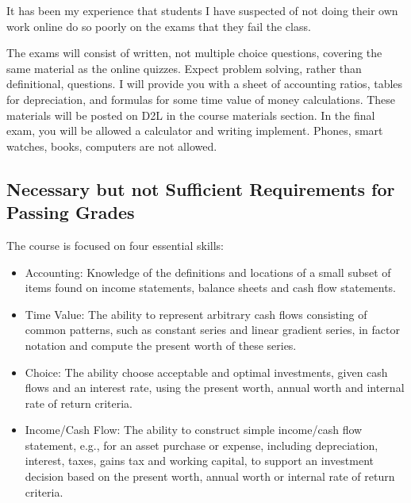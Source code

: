 \documentclass[letterpaper,10pt]{article}
\newif\ifonline
\begin{document}
It has been my experience that students I have suspected of not doing their own work online do so poorly on the exams that they fail the class.

The exams will consist of written, not multiple choice questions, covering the same material as the online quizzes.  Expect problem solving, rather than definitional, questions. I will provide you with a sheet of accounting ratios, tables for depreciation, and formulas for some time value of money calculations.  These materials will be posted on D2L in the course materials section.  In the final exam, you will be allowed a calculator and writing implement.  Phones, smart watches, books, computers are not allowed.

\ifonline

\else
   \subsection{ Necessary but not Sufficient Requirements for Passing Grades}\label{sec:essentialSkills}
  
   The course is focused on four essential skills:
   
   \begin{itemize}
   
   \item Accounting: Knowledge of the definitions and locations of a
     small subset of items found on income statements, balance sheets and
     cash flow statements.
   
   \item Time Value: The ability to represent arbitrary cash flows
     consisting of common patterns, such as constant series and linear
     gradient series, in factor notation and compute the present worth of
     these series.
   
   \item Choice: The ability choose acceptable and optimal investments,
     given cash flows and an interest rate, using the present worth,
     annual worth and internal rate of return criteria.
   
   \item Income/Cash Flow: The ability to construct simple income/cash
     flow statement, e.g., for an asset purchase or expense, including
     depreciation, interest, taxes, gains tax and working capital, to
     support an investment decision based on the present worth, annual
     worth or internal rate of return criteria.
   \end{itemize}
   
\end{document}
